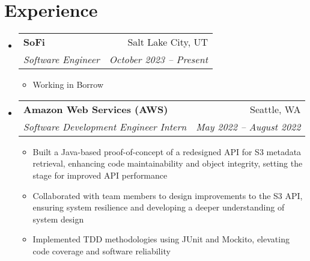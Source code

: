 \documentclass[letterpaper,11pt]{article}
\makeatletter
\newcommand{\resumeItem}[1]{
  \item\small{
    {#1 \vspace{-2pt}}
  }
}
\newcommand{\resumeSubheading}[4]{
  \vspace{-2pt}\item
    \begin{tabular*}{0.97\textwidth}[t]{l@{\extracolsep{\fill}}r}
      \textbf{#1} & #2 \\
      \textit{\small#3} & \textit{\small #4} \\
    \end{tabular*}\vspace{-7pt}
}
\newcommand{\resumeSubSubheading}[2]{
    \item
    \begin{tabular*}{0.97\textwidth}{l@{\extracolsep{\fill}}r}
      \textit{\small#1} & \textit{\small #2} \\
    \end{tabular*}\vspace{-7pt}
}
\newcommand{\resumeSubHeadingListStart}{\begin{itemize}[leftmargin=0.15in, label={}]}
\newcommand{\resumeSubHeadingListEnd}{\end{itemize}}
\newcommand{\resumeItemListStart}{\begin{itemize}}
\newcommand{\resumeItemListEnd}{\end{itemize}\vspace{-5pt}}
\makeatother
\begin{document}

\section{Experience}
  \resumeSubHeadingListStart
  \resumeSubheading
      {SoFi}{Salt Lake City, UT}
      {Software Engineer}{October 2023 -- Present}
      \resumeItemListStart
        \resumeItem{Working in Borrow}
     \resumeItemListEnd

    \resumeSubheading
      {Amazon Web Services (AWS)}{Seattle, WA}
      {Software Development Engineer Intern}{May 2022 -- August 2022}
      \resumeItemListStart
        \resumeItem{Built a Java-based proof-of-concept of a redesigned API for S3 metadata retrieval, enhancing code maintainability and object integrity, setting the stage for improved API performance}
        \resumeItem{
        Collaborated with team members to design improvements to the S3 API, ensuring system resilience and developing a deeper understanding of system design}
        \resumeItem{Implemented TDD methodologies using JUnit and Mockito, elevating code coverage and software reliability}

      \resumeItemListEnd
      

  \resumeSubHeadingListEnd

%

\end{document}
